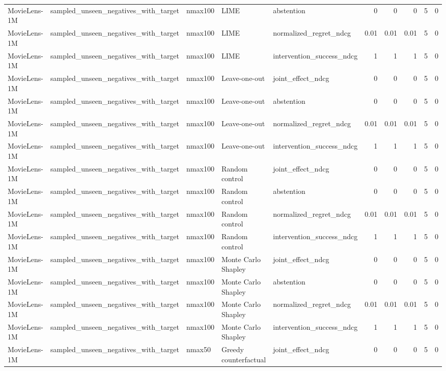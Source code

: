 \begin{table}[t]
{\begin{tabular}{lllllrrrrr}
MovieLens-1M & sampled\_unseen\_negatives\_with\_target & nmax100 & LIME & abstention & 0 & 0 & 0 & 5 & 0 \\
MovieLens-1M & sampled\_unseen\_negatives\_with\_target & nmax100 & LIME & normalized\_regret\_ndcg & 0.01 & 0.01 & 0.01 & 5 & 0 \\
MovieLens-1M & sampled\_unseen\_negatives\_with\_target & nmax100 & LIME & intervention\_success\_ndcg & 1 & 1 & 1 & 5 & 0 \\
MovieLens-1M & sampled\_unseen\_negatives\_with\_target & nmax100 & Leave-one-out & joint\_effect\_ndcg & 0 & 0 & 0 & 5 & 0 \\
MovieLens-1M & sampled\_unseen\_negatives\_with\_target & nmax100 & Leave-one-out & abstention & 0 & 0 & 0 & 5 & 0 \\
MovieLens-1M & sampled\_unseen\_negatives\_with\_target & nmax100 & Leave-one-out & normalized\_regret\_ndcg & 0.01 & 0.01 & 0.01 & 5 & 0 \\
MovieLens-1M & sampled\_unseen\_negatives\_with\_target & nmax100 & Leave-one-out & intervention\_success\_ndcg & 1 & 1 & 1 & 5 & 0 \\
MovieLens-1M & sampled\_unseen\_negatives\_with\_target & nmax100 & Random control & joint\_effect\_ndcg & 0 & 0 & 0 & 5 & 0 \\
MovieLens-1M & sampled\_unseen\_negatives\_with\_target & nmax100 & Random control & abstention & 0 & 0 & 0 & 5 & 0 \\
MovieLens-1M & sampled\_unseen\_negatives\_with\_target & nmax100 & Random control & normalized\_regret\_ndcg & 0.01 & 0.01 & 0.01 & 5 & 0 \\
MovieLens-1M & sampled\_unseen\_negatives\_with\_target & nmax100 & Random control & intervention\_success\_ndcg & 1 & 1 & 1 & 5 & 0 \\
MovieLens-1M & sampled\_unseen\_negatives\_with\_target & nmax100 & Monte Carlo Shapley & joint\_effect\_ndcg & 0 & 0 & 0 & 5 & 0 \\
MovieLens-1M & sampled\_unseen\_negatives\_with\_target & nmax100 & Monte Carlo Shapley & abstention & 0 & 0 & 0 & 5 & 0 \\
MovieLens-1M & sampled\_unseen\_negatives\_with\_target & nmax100 & Monte Carlo Shapley & normalized\_regret\_ndcg & 0.01 & 0.01 & 0.01 & 5 & 0 \\
MovieLens-1M & sampled\_unseen\_negatives\_with\_target & nmax100 & Monte Carlo Shapley & intervention\_success\_ndcg & 1 & 1 & 1 & 5 & 0 \\
MovieLens-1M & sampled\_unseen\_negatives\_with\_target & nmax50 & Greedy counterfactual & joint\_effect\_ndcg & 0 & 0 & 0 & 5 & 0 \\

\end{tabular}}
\end{table}
